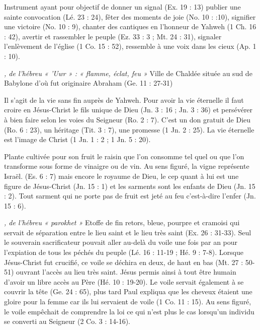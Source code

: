 \begin{multicols}{2}
\textit{}\newline
Instrument ayant pour objectif de donner un signal (Ex. 19 : 13) publier une sainte convocation (Lé. 23 : 24), fêter des moments de joie (No. 10 : :10), signifier une victoire (No. 10 : 9), chanter des cantiques en l'honneur de Yahweh (1 Ch. 16 : 42), avertir et rassembler le peuple (Ez. 33 : 3 ; Mt. 24 : 31), signaler l'enlèvement de l'église (1 Co. 15 : 52), ressemble à une voix dans les cieux (Ap. 1 : 10).

\textit{, de l'hébreu « 'Uwr » : « flamme, éclat, feu »}\newline
Ville de Chaldée située au sud de Babylone d'où fut originaire Abraham (Ge. 11 : 27-31)

\textit{}\newline
Il s'agit de la vie sans fin auprès de Yahweh. Pour avoir la vie éternelle il faut croire en Jésus-Christ le fils unique de Dieu (Jn. 3 : 16 ; Jn. 3 : 36) et persévérer à bien faire selon les voies du Seigneur (Ro. 2 : 7). C'est un don gratuit de Dieu (Ro. 6 : 23), un héritage (Tit. 3 : 7), une promesse (1 Jn. 2 : 25). La vie éternelle est l'image de Christ (1 Jn. 1 : 2 ; 1 Jn. 5 : 20).

\textit{}\newline
Plante cultivée pour son fruit le raisin que l'on consomme tel quel ou que l'on transforme sous forme de vinaigre ou de vin. Au sens figuré, la vigne représente Israël. (Es. 6 : 7) mais encore le royaume de Dieu, le cep quant à lui est une figure de Jésus-Christ (Jn. 15 : 1) et les sarments sont les enfants de Dieu (Jn. 15 : 2). Tout sarment qui ne porte pas de fruit est jeté au feu c'est-à-dire l'enfer (Jn. 15 : 6).

\textit{, de l'hébreu « parokhet »}\newline
Etoffe de fin retors, bleue, pourpre et cramoisi qui servait de séparation entre le lieu saint et le lieu très saint (Ex. 26 : 31-33). Seul le souverain sacrificateur pouvait aller au-delà du voile une fois par an pour l'expiation de tous les péchés du peuple (Lé. 16 : 11-19 ; Hé. 9 : 7-8). Lorsque Jésus-Christ fut crucifié, ce voile se déchira en deux, de haut en bas (Mt. 27 : 50-51) ouvrant l'accès au lieu très saint. Jésus permis ainsi à tout être humain d'avoir un libre accès au Père (Hé. 10 : 19-20).
Le voile servait également à se couvrir la tête (Ge. 24 : 65), plus tard Paul expliqua que les cheveux étaient une gloire pour la femme car ils lui servaient de voile (1 Co. 11 : 15). Au sens figuré, le voile empêchait de comprendre la loi ce qui n'est plus le cas lorsqu'un individu se converti au Seigneur (2 Co. 3 : 14-16).


\end{multicols}
